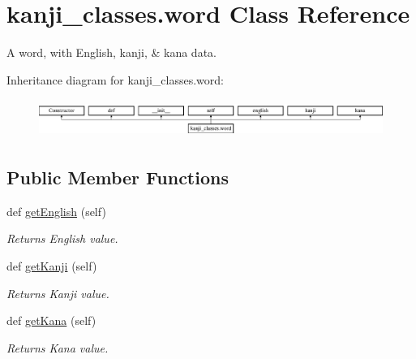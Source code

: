 \hypertarget{classkanji__classes_1_1word}{}\section{kanji\+\_\+classes.\+word Class Reference}
\label{classkanji__classes_1_1word}


A word, with English, kanji, \& kana data.  


Inheritance diagram for kanji\+\_\+classes.\+word\+:\begin{figure}[H]
\begin{center}
\leavevmode
\includegraphics[height=1.259843cm]{classkanji__classes_1_1word}
\end{center}
\end{figure}
\subsection*{Public Member Functions}
\begin{DoxyCompactItemize}
\item 
\mbox{\label{classkanji__classes_1_1word_a1b27faefd48f71839d2bce0309ca7e63}} 
def \mbox{\hyperlink{classkanji__classes_1_1word_a1b27faefd48f71839d2bce0309ca7e63}{get\+English}} (self)
\begin{DoxyCompactList}\small\item\em Returns English value. \end{DoxyCompactList}\item 
\mbox{\label{classkanji__classes_1_1word_a89f10ee98bb2aace6179be5ff28919d7}} 
def \mbox{\hyperlink{classkanji__classes_1_1word_a89f10ee98bb2aace6179be5ff28919d7}{get\+Kanji}} (self)
\begin{DoxyCompactList}\small\item\em Returns Kanji value. \end{DoxyCompactList}\item 
\mbox{\label{classkanji__classes_1_1word_a0546c03493d93191e70686c1c59916c5}} 
def \mbox{\hyperlink{classkanji__classes_1_1word_a0546c03493d93191e70686c1c59916c5}{get\+Kana}} (self)
\begin{DoxyCompactList}\small\item\em Returns Kana value. \end{DoxyCompactList}\end{DoxyCompactItemize}

